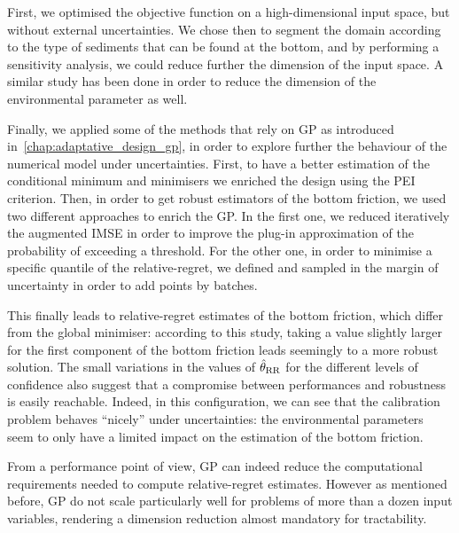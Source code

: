 \documentclass[../../Main_ManuscritThese.tex]{subfiles}
\begin{document}
First, we optimised the objective function on a high-dimensional input
space, but without external uncertainties. We chose then to segment
the domain according to the type of sediments that can be found at the
bottom, and by performing a sensitivity analysis, we could reduce
further the dimension of the input space.
A similar study has been done in order to reduce the dimension of the
environmental parameter as well.

Finally, we applied some of the methods that rely on GP as introduced
in~\cref{chap:adaptative_design_gp}, in order to explore further the
behaviour of the numerical model under uncertainties. First, to have a
better estimation of the conditional minimum and minimisers we
enriched the design using the PEI criterion. Then, in order to get
robust estimators of the bottom friction, we used two different
approaches to enrich the GP. In the first one, we reduced iteratively
the augmented IMSE in order to improve the plug-in approximation of
the probability of exceeding a threshold. For the other one, in order
to minimise a specific quantile of the relative-regret, we defined and
sampled in the margin of uncertainty in order to add points by
batches.

This finally leads to relative-regret estimates of the bottom
friction, which differ from the global minimiser: according to this
study, taking a value slightly larger for the first component of the
bottom friction leads seemingly to a more robust solution. The small
variations in the values of $\hat{\theta}_{\mathrm{RR}}$ for the
different levels of confidence also suggest that a compromise between
performances and robustness is easily reachable. Indeed, in this
configuration, we can see that the calibration problem behaves
``nicely'' under uncertainties: the environmental
parameters seem to only have a limited impact on the estimation of the
bottom friction. 





From a performance point of view, GP can indeed reduce the
computational requirements needed to compute relative-regret
estimates. However as mentioned before, GP do not scale particularly
well for problems of more than a dozen input variables, rendering a
dimension reduction almost mandatory for tractability.
\end{document}
